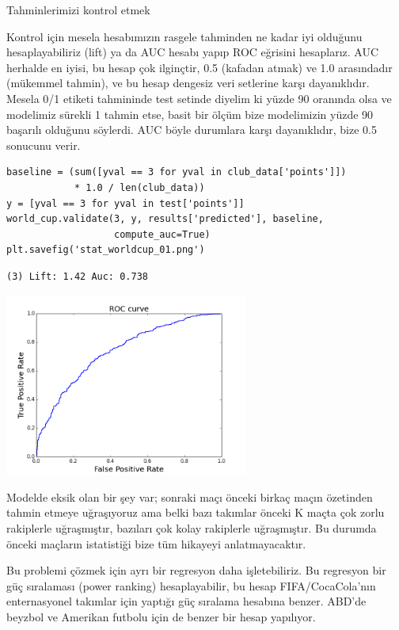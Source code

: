 \documentclass[12pt,fleqn]{article}\usepackage{../../common}
\begin{document}
Tahminlerimizi kontrol etmek

Kontrol için mesela hesabımızın rasgele tahminden ne kadar iyi olduğunu
hesaplayabiliriz (lift) ya da AUC hesabı yapıp ROC eğrisini hesaplarız. AUC
herhalde en iyisi, bu hesap çok ilginçtir, 0.5 (kafadan atmak) ve 1.0
arasındadır (mükemmel tahmin), ve bu hesap dengesiz veri setlerine karşı
dayanıklıdır. Mesela 0/1 etiketi tahmininde test setinde diyelim ki yüzde 90
oranında olsa ve modelimiz sürekli 1 tahmin etse, basit bir ölçüm bize
modelimizin yüzde 90 başarılı olduğunu söylerdi. AUC böyle durumlara karşı
dayanıklıdır, bize 0.5 sonucunu verir. 

\begin{verbatim}
baseline = (sum([yval == 3 for yval in club_data['points']]) 
            * 1.0 / len(club_data))
y = [yval == 3 for yval in test['points']]
world_cup.validate(3, y, results['predicted'], baseline, 
                   compute_auc=True)
plt.savefig('stat_worldcup_01.png')
\end{verbatim}

\begin{verbatim}
(3) Lift: 1.42 Auc: 0.738
\end{verbatim}

\includegraphics[height=6cm]{stat_worldcup_01.png}

Modelde eksik olan bir şey var; sonraki maçı önceki birkaç maçın özetinden
tahmin etmeye uğraşıyoruz ama belki bazı takımlar önceki K maçta çok zorlu
rakiplerle uğraşmıştır, bazıları çok kolay rakiplerle uğraşmıştır. Bu
durumda önceki maçların istatistiği bize tüm hikayeyi anlatmayacaktır. 

Bu problemi çözmek için ayrı bir regresyon daha işletebiliriz. Bu regresyon
bir güç sıralaması (power ranking) hesaplayabilir, bu hesap
FIFA/CocaCola'nın enternasyonel takımlar için yaptığı 
güç sıralama hesabına benzer. ABD'de beyzbol ve Amerikan futbolu için de
benzer bir hesap yapılıyor. 
\end{document}
